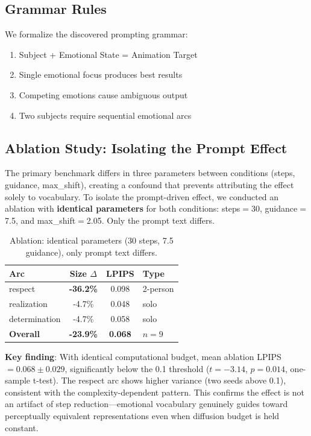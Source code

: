 \documentclass[10pt,twocolumn,letterpaper]{article}
\begin{document}
\subsection{Grammar Rules}

We formalize the discovered prompting grammar:

\begin{enumerate}
    \item Subject + Emotional State = Animation Target
    \item Single emotional focus produces best results
    \item Competing emotions cause ambiguous output
    \item Two subjects require sequential emotional arcs
\end{enumerate}

\subsection{Ablation Study: Isolating the Prompt Effect}
\label{sec:ablation}

The primary benchmark differs in three parameters between conditions (steps, guidance, max\_shift), creating a confound that prevents attributing the effect solely to vocabulary. To isolate the prompt-driven effect, we conducted an ablation with \textbf{identical parameters} for both conditions: steps$=$30, guidance$=$7.5, and max\_shift$=$2.05. Only the prompt text differs.

\begin{table}[t]
\centering
\small
\begin{tabular}{lccl}
\toprule
\textbf{Arc} & \textbf{Size $\Delta$} & \textbf{LPIPS} & \textbf{Type} \\
\midrule
respect & \textbf{-36.2\%} & 0.098 & 2-person \\
realization & -4.7\% & 0.048 & solo \\
determination & -4.7\% & 0.058 & solo \\
\midrule
\textbf{Overall} & \textbf{-23.9\%} & \textbf{0.068} & \textbf{$n=9$} \\
\bottomrule
\end{tabular}
\caption{Ablation: identical parameters (30 steps, 7.5 guidance), only prompt text differs.}
\end{table}

\textbf{Key finding}: With identical computational budget, mean ablation LPIPS $= 0.068 \pm 0.029$, significantly below the 0.1 threshold ($t = -3.14$, $p = 0.014$, one-sample t-test). The respect arc shows higher variance (two seeds above 0.1), consistent with the complexity-dependent pattern. This confirms the effect is not an artifact of step reduction---emotional vocabulary genuinely guides toward perceptually equivalent representations even when diffusion budget is held constant.
\end{document}

